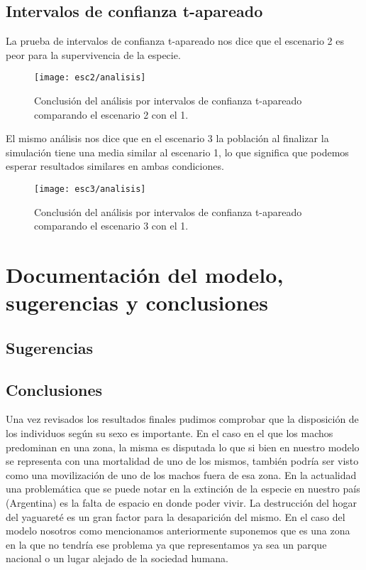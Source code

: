         \subsection{Intervalos de confianza t-apareado}

            La prueba de intervalos de confianza t-apareado nos dice que el escenario 2 es peor para la supervivencia de la especie.

            \begin{figure}[H]
                \centering
                \texttt{[image: esc2/analisis]}
                \caption{Conclusión del análisis por intervalos de confianza t-apareado comparando el escenario 2 con el 1.}
                \label{fig:esc2-analisis}
            \end{figure}

            El mismo análisis nos dice que en el escenario 3 la población al finalizar la simulación tiene una media
            similar al escenario 1, lo que significa que podemos esperar resultados similares en ambas condiciones.

            \begin{figure}[H]
                \centering
                \texttt{[image: esc3/analisis]}
                \caption{Conclusión del análisis por intervalos de confianza t-apareado comparando el escenario 3 con el 1.}
                \label{fig:esc3-analisis}
            \end{figure}

            
\section{Documentación del modelo, sugerencias y conclusiones}
 \subsection{Sugerencias}

 \subsection{Conclusiones}
  Una vez revisados los resultados finales pudimos comprobar que la disposición de los individuos según su sexo es importante. En el caso en el que los machos predominan en una zona, la misma es disputada lo que si bien en nuestro modelo se representa con una mortalidad de uno de los mismos, también podría ser visto como una movilización de uno de los machos fuera de esa zona. En la actualidad una problemática que se puede notar en la extinción de la especie en nuestro país (Argentina) es la falta de espacio en donde poder vivir. La destrucción del hogar del yaguareté es un gran factor para la desaparición del mismo. En el caso del modelo nosotros como mencionamos anteriormente suponemos que es una zona en la que no tendría ese problema ya que representamos ya sea un parque nacional o un lugar alejado de la sociedad humana.

